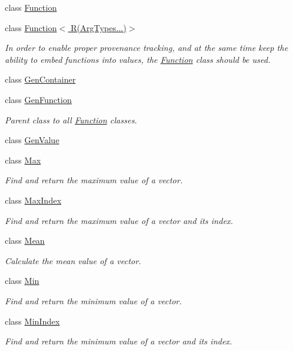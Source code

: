 \begin{DoxyCompactItemize}
\item 
class \hyperlink{classfv_1_1Function}{Function}
\item 
class \hyperlink{classfv_1_1Function_3_01R_07ArgTypes_8_8_8_08_4}{Function$<$ R(\+Arg\+Types...)$>$}
\begin{DoxyCompactList}\small\item\em In order to enable proper provenance tracking, and at the same time keep the ability to embed functions into values, the \hyperlink{classfv_1_1Function}{Function} class should be used. \end{DoxyCompactList}\item 
class \hyperlink{classfv_1_1GenContainer}{Gen\+Container}
\item 
class \hyperlink{classfv_1_1GenFunction}{Gen\+Function}
\begin{DoxyCompactList}\small\item\em Parent class to all \hyperlink{classfv_1_1Function}{Function} classes. \end{DoxyCompactList}\item 
class \hyperlink{classfv_1_1GenValue}{Gen\+Value}
\item 
class \hyperlink{classfv_1_1Max}{Max}
\begin{DoxyCompactList}\small\item\em Find and return the maximum value of a vector. \end{DoxyCompactList}\item 
class \hyperlink{classfv_1_1MaxIndex}{Max\+Index}
\begin{DoxyCompactList}\small\item\em Find and return the maximum value of a vector and its index. \end{DoxyCompactList}\item 
class \hyperlink{classfv_1_1Mean}{Mean}
\begin{DoxyCompactList}\small\item\em Calculate the mean value of a vector. \end{DoxyCompactList}\item 
class \hyperlink{classfv_1_1Min}{Min}
\begin{DoxyCompactList}\small\item\em Find and return the minimum value of a vector. \end{DoxyCompactList}\item 
class \hyperlink{classfv_1_1MinIndex}{Min\+Index}
\begin{DoxyCompactList}\small\item\em Find and return the minimum value of a vector and its index. \end{DoxyCompactList}\item 

\end{DoxyCompactItemize}
